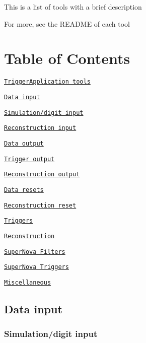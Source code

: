 This is a list of tools with a brief description

For more, see the R\-E\-A\-D\-M\-E of each tool

\section*{Table of Contents }


\begin{DoxyItemize}
\item \href{#triggerapplication-tools}{\tt Trigger\-Application tools}
\begin{DoxyItemize}
\item \href{#data-input}{\tt Data input}
\begin{DoxyItemize}
\item \href{#simulationdigit-input}{\tt Simulation/digit input}
\item \href{#reconstruction-input}{\tt Reconstruction input}
\end{DoxyItemize}
\item \href{#data-output}{\tt Data output}
\begin{DoxyItemize}
\item \href{#trigger-output}{\tt Trigger output}
\item \href{#reconstruction-output}{\tt Reconstruction output}
\end{DoxyItemize}
\item \href{#data-resets}{\tt Data resets}
\begin{DoxyItemize}
\item \href{#reconstruction-reset}{\tt Reconstruction reset}
\end{DoxyItemize}
\item \href{#triggers}{\tt Triggers}
\item \href{#reconstruction}{\tt Reconstruction}
\item \href{#supernova-filters}{\tt Super\-Nova Filters}
\item \href{#supernova-triggers}{\tt Super\-Nova Triggers}
\item \href{#miscellaneous}{\tt Miscellaneous}
\end{DoxyItemize}
\end{DoxyItemize}

\subsection*{Data input}

\subsubsection*{Simulation/digit input}


